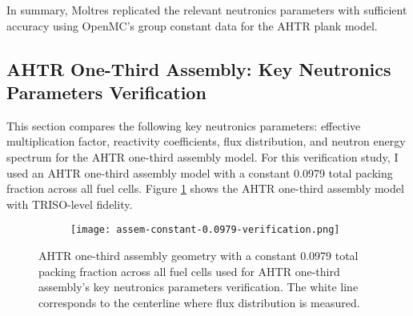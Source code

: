 In summary, Moltres replicated the relevant neutronics parameters with sufficient 
accuracy using OpenMC's group constant data for the \gls{AHTR} plank model. 
\pagebreak

\subsection{AHTR One-Third Assembly: Key Neutronics Parameters Verification}
This section compares the following key neutronics parameters: effective multiplication 
factor, reactivity coefficients, flux distribution, and neutron energy spectrum for the 
\gls{AHTR} one-third assembly model. 
For this verification study, I used an AHTR one-third assembly model with a constant 
0.0979 total packing fraction across all fuel cells.  
Figure \ref{fig:ahtr-assem-verification} shows the \gls{AHTR} one-third assembly 
model with TRISO-level fidelity.
\begin{figure}[htbp]
    \centering
    \begin{subfigure}{.7\textwidth}
    \texttt{[image: assem-constant-0.0979-verification.png]}
    \end{subfigure}%
    \begin{subfigure}{.3\textwidth}
        \vspace{1cm}
    \end{subfigure}
    \caption{AHTR one-third assembly geometry with a constant 0.0979 total packing 
    fraction across all fuel cells used for AHTR one-third assembly's key neutronics 
    parameters verification. 
    The white line corresponds to the centerline where flux distribution is measured. }  
    \label{fig:ahtr-assem-verification}
\end{figure}

